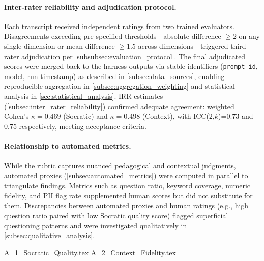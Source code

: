 \paragraph{Inter-rater reliability and adjudication protocol.} Each transcript received independent ratings from two trained evaluators. Disagreements exceeding pre-specified thresholds—absolute difference $\geq 2$ on any single dimension or mean difference $\geq 1.5$ across dimensions—triggered third-rater adjudication per \cref{subsubsec:evaluation_protocol}. The final adjudicated scores were merged back to the harness outputs via stable identifiers (\verb|prompt_id|, model, run timestamp) as described in \cref{subsec:data_sources}, enabling reproducible aggregation in \cref{subsec:aggregation_weighting} and statistical analysis in \cref{sec:statistical_analysis}. IRR estimates (\cref{subsec:inter_rater_reliability}) confirmed adequate agreement: weighted Cohen's $\kappa=0.469$ (Socratic) and $\kappa=0.498$ (Context), with ICC(2,$k$)=0.73 and 0.75 respectively, meeting acceptance criteria.

\paragraph{Relationship to automated metrics.} While the rubric captures nuanced pedagogical and contextual judgments, automated proxies (\cref{subsec:automated_metrics}) were computed in parallel to triangulate findings. Metrics such as question ratio, keyword coverage, numeric fidelity, and PII flag rate supplemented human scores but did not substitute for them. Discrepancies between automated proxies and human ratings (e.g., high question ratio paired with low Socratic quality score) flagged superficial questioning patterns and were investigated qualitatively in \cref{subsec:qualitative_analysis}.

{A_1_Socratic_Quality.tex}
{A_2_Context_Fidelity.tex}

